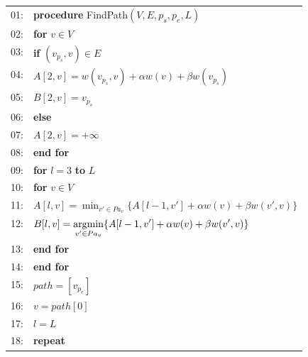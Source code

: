 \begin{figure}
\centering
\begin{tabular}{p{3pt}l}
01:&\textbf{procedure} FindPath$(V, E, p_s, p_e, L)$ \\
02:&\hspace{10pt} \textbf{for} $v \in V$ \\
03:&\hspace{20pt}     \textbf{if} $(v_{p_s}, v) \in E$ \\
04:&\hspace{30pt}         $A[2, v] = w(v_{p_s}, v) + \alpha w(v) + \beta w(v_{p_s})$ \\
05:&\hspace{30pt}         $B[2, v] = v_{p_s}$ \\
06:&\hspace{20pt}     \textbf{else} \\
07:&\hspace{30pt}         $A[2, v] = +\infty$ \\
08:&\hspace{10pt} \textbf{end for} \\
09:&\hspace{10pt} \textbf{for} $l=3$ \textbf{to} $L$ \\
10:&\hspace{20pt}     \textbf{for} $v \in V$ \\
11:&\hspace{30pt}         \(\displaystyle A[l, v] = \min_{v' \in Pa_v} \{ A[l-1, v'] + \alpha w(v) + \beta w(v', v) \} \) \\
12:&\hspace{30pt}         \(\displaystyle B[l, v] = \operatorname*{argmin}_{v' \in Pa_v} \{ A[l-1, v'] + \alpha w(v) + \beta w(v', v) \} \)\\
13:&\hspace{20pt}     \textbf{end for} \\
14:&\hspace{10pt} \textbf{end for} \\
15:&\hspace{10pt} $path = [v_{p_e}]$ \\
16:&\hspace{10pt} $v = path[0]$ \\
17:&\hspace{10pt} $l = L$ \\
18:&\hspace{10pt} \textbf{repeat} \\

\end{tabular}
\end{figure}
